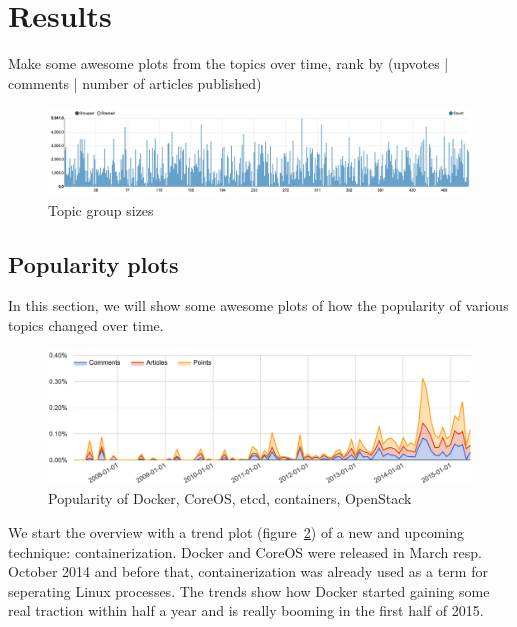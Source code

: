 \section{Results}
\label{sec:results}
Make some awesome plots from the topics over time, rank by (upvotes | comments | number of articles published)

\begin{figure}[H]
	\caption{Topic group sizes}
	\label{fig:topicsizes}
	\centering
	\includegraphics[width=14cm]{topicsizes}
\end{figure}

\subsection{Popularity plots}
In this section, we will show some awesome plots of how the popularity of various topics changed over time.

\begin{figure}[H] %
	\caption{Popularity of Docker, CoreOS, etcd, containers, OpenStack}
	\label{fig:trend_docker}
	\centering
	\includegraphics[width=14cm]{topic_trends/docker_relative}
\end{figure}
We start the overview with a trend plot (figure~\ref{fig:trend_docker}) of a new and upcoming technique: containerization. Docker and CoreOS were released in March resp. October 2014 and before that, containerization was already used as a term for seperating Linux processes. The trends show how Docker started gaining some real traction within half a year and is really booming in the first half of 2015.

